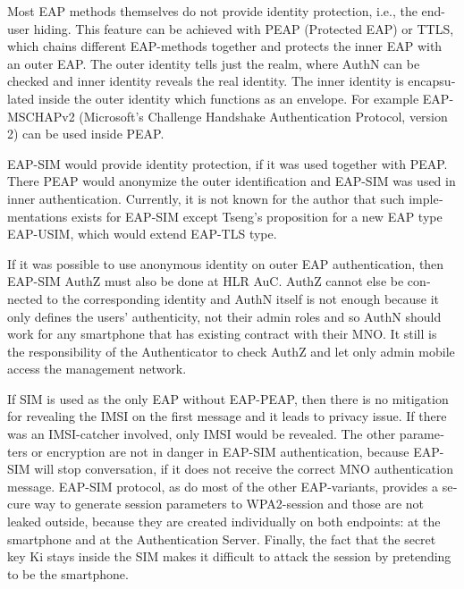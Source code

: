 \documentclass[12pt,a4paper,english]{tutthesis}
\begin{document}
\begin{otherlanguage}{english}
Most EAP methods themselves do not provide identity protection, i.e., the
end-user hiding.
This feature can be achieved with PEAP (Protected EAP) or TTLS, which
chains different EAP-methods together and protects the inner EAP with
an outer EAP. 
The outer identity tells just the realm, where AuthN can be checked
and inner identity reveals the real identity.  The inner identity is
encapsulated inside the outer identity which functions as an
envelope. 
For example EAP-MSCHAPv2 (Microsoft's Challenge
Handshake Authentication Protocol, version 2) can be used inside PEAP.


EAP-SIM would provide identity protection, if it was used together
with PEAP. There PEAP would anonymize the outer identification  and
EAP-SIM was used in inner authentication.
Currently, it is not known for the author that such implementations exists for
EAP-SIM  except Tseng's proposition\cite{tseng-usim} for a new EAP type
EAP-USIM, which would extend EAP-TLS type.

If it was possible to use anonymous identity on outer EAP
authentication, then EAP-SIM AuthZ must also be done at HLR AuC.
AuthZ cannot else be connected to the corresponding
identity and AuthN itself is not enough because it only defines the users'
authenticity, not their admin roles and so 
AuthN should work for any  smartphone that has existing contract with
their MNO. 
It still is the responsibility of the Authenticator to 
check AuthZ  and let only admin mobile access the management network.

If SIM is used as the only EAP without EAP-PEAP, then there is no
mitigation for revealing the IMSI on the first message and it leads to
privacy issue.  If there was an IMSI-catcher involved, only IMSI would
be revealed.  The other parameters or encryption are not in danger in
EAP-SIM authentication, because EAP-SIM will stop conversation, if it
does not receive the correct MNO authentication message.  EAP-SIM
protocol, as do most of the other EAP-variants, provides a secure way
to generate session parameters to WPA2-session and those are not
leaked outside, because they are created individually on both
endpoints: at the smartphone and at the Authentication Server.
Finally, the fact that the secret key Ki stays inside the SIM makes it
difficult to attack the session by pretending to be the smartphone.







\end{otherlanguage}
\end{document}
